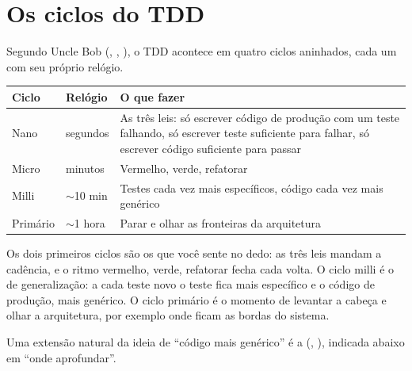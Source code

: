 \section{Os ciclos do TDD}

Segundo Uncle Bob (\citeauthor{artigo:cycles-tdd}, \citeyear{artigo:cycles-tdd},
), o TDD acontece em quatro ciclos aninhados,
cada um com seu próprio relógio.

\begin{center}
\small
\begin{tabular}{@{}l l p{8cm}@{}}
\toprule
Ciclo & Relógio & O que fazer \\
\midrule
Nano & segundos & As três leis: só escrever código de produção com um teste
falhando, só escrever teste suficiente para falhar, só escrever código
suficiente para passar \\
Micro & minutos & Vermelho, verde, refatorar \\
Milli & $\sim$10 min & Testes cada vez mais específicos, código cada vez
mais genérico \\
Primário & $\sim$1 hora & Parar e olhar as fronteiras da arquitetura \\
\bottomrule
\end{tabular}
\end{center}

Os dois primeiros ciclos são os que você sente no dedo: as três leis
mandam a cadência, e o ritmo vermelho, verde, refatorar fecha cada volta.
O ciclo milli é o de generalização: a cada teste novo o teste fica mais
específico e o código de produção, mais genérico. O ciclo primário é o
momento de levantar a cabeça e olhar a arquitetura, por exemplo onde
ficam as bordas do sistema.

Uma extensão natural da ideia de ``código mais genérico'' é a
 (\citeauthor{artigo:tpp}, \citeyear{artigo:tpp}),
indicada abaixo em \enquote{onde aprofundar}.
